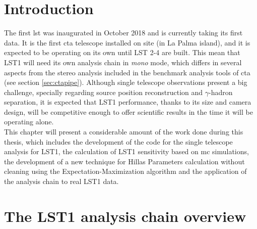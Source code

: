 \documentclass[main.tex]{subfiles}
\begin{document}
\glsresetall

\section{Introduction}

The first \gls{lst} was inaugurated in October 2018 and is currently taking its first data. It is the first \gls{cta} telescope installed on site (in La Palma island), and it is expected to be operating on its own until LST 2-4 are built. This mean that LST1 will need its own analysis chain in \textit{mono} mode, which differs in several aspects from the stereo analysis included in the benchmark analysis tools of \gls{cta} (see section \ref{sec:ctapipe}). Although single telescope observations present a big challenge, specially regarding source position reconstruction and $\gamma$-hadron separation, it is expected that LST1 performance, thanks to its size and camera design, will be competitive enough to offer scientific results in the time it will be operating alone.\\
This chapter will present a considerable amount of the work done during this thesis, which includes the development of the code for the single telescope analysis for LST1, the calculation of LST1 sensitivity based on \gls{mc} simulations, the development of a new technique for Hillas Parameters calculation without cleaning using the Expectation-Maximization algorithm and the application of the analysis chain to real LST1 data. 

\section{The LST1 analysis chain overview} \label{sec:anachain}
\end{document}
